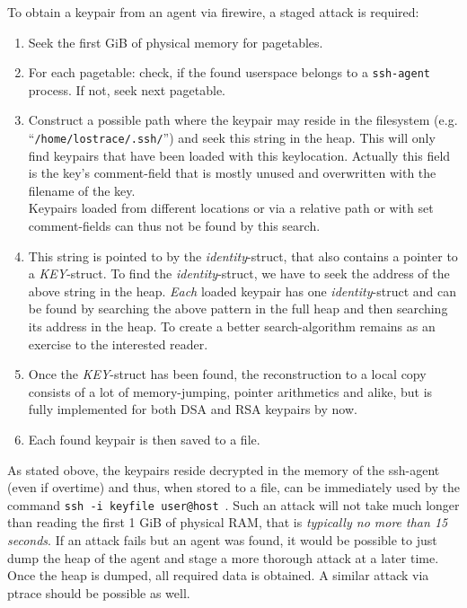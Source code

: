 To obtain a keypair from an agent via firewire, a staged attack is required:

\begin{enumerate}

	\item Seek the first GiB of physical memory for pagetables.

	\item For each pagetable: check, if the found userspace belongs to a
	\texttt{ssh-agent} process. If not, seek next pagetable.

	\item Construct a possible path where the keypair may reside in the
	filesystem (e.g. ``\texttt{/home/lostrace/.ssh/}'') and seek this string
	in the heap. This will only find keypairs that have been loaded with
	this keylocation. Actually this field is the key's comment-field that is
	mostly unused and overwritten with the filename of the key. \\ Keypairs
	loaded from different locations or via a relative path or with set
	comment-fields can thus not be found by this search.
	
	\item This string is pointed to by the \emph{identity}-struct, that also
	contains a pointer to a \emph{KEY}-struct. To find the
	\emph{identity}-struct, we have to seek the address of the above string
	in the heap. \emph{Each} loaded keypair has one \emph{identity}-struct
	and can be found by searching the above pattern in the full heap and
	then searching its address in the heap.	To create a better
	search-algorithm remains as an exercise to the interested reader.

	\item Once the \emph{KEY}-struct has been found, the reconstruction to a
	local copy consists of a lot of memory-jumping, pointer arithmetics and
	alike, but is fully implemented for both DSA and RSA keypairs by now.

	\item Each found keypair is then saved to a file.
	
\end{enumerate}

As stated obove, the keypairs reside decrypted in the memory of the ssh-agent
(even if overtime) and thus, when stored to a file, can be immediately used by
the command \texttt{ssh~-i~keyfile~user@host}~.  Such an attack will not take
much longer than reading the first 1 GiB of physical RAM, that is
\emph{typically no more than 15 seconds}. If an attack fails but an agent was
found, it would be possible to just dump the heap of the agent and stage a more
thorough attack at a later time.  Once the heap is dumped, all required data is
obtained.  A similar attack via ptrace should be possible as well.


